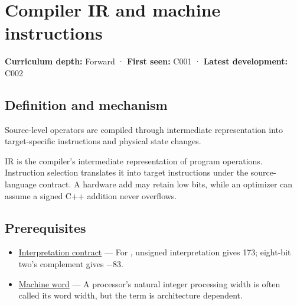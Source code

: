 \hypertarget{appendix-942ad41afb30}{}\label{referencestart:appendix-942ad41afb30}
\section{Compiler IR and machine instructions}\label{appendix-942ad41afb30-compiler-ir-and-machine-instructions}

\hypertarget{appendix-942ad41afb30-compiler-ir-and-machine-instructions}{}

\textbf{Curriculum depth:} Forward · \textbf{First seen:} C001 · \textbf{Latest development:} C002

\begin{allmightroledefinition}

\subsection{Definition and mechanism}\label{appendix-942ad41afb30-definition-and-mechanism}

\hypertarget{appendix-942ad41afb30-definition-and-mechanism}{}

Source-level operators are compiled through intermediate representation into target-specific instructions and physical state changes.

\end{allmightroledefinition}

IR is the compiler's intermediate representation of program operations. Instruction selection translates it into target instructions under the source-language contract. A hardware add may retain low bits, while an optimizer can assume a signed C++ addition never overflows.

\subsection{Prerequisites}\label{appendix-942ad41afb30-prerequisites}

\hypertarget{appendix-942ad41afb30-prerequisites}{}

\begin{itemize}
\tightlist
\item
  \hyperref[appendix-f414bd4ed05c]{Interpretation contract} --- For , unsigned interpretation gives 173; eight-bit two's complement gives −83.
\item
  \hyperref[appendix-d67a19507dc5]{Machine word} --- A processor's natural integer processing width is often called its word width, but the term is architecture dependent.
\end{itemize}

